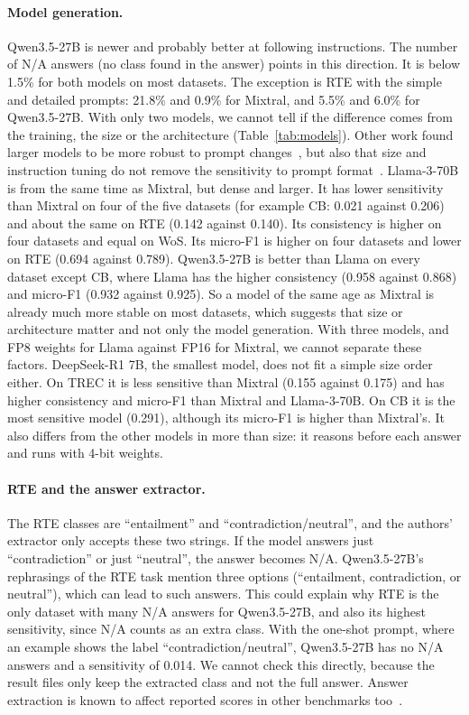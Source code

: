 \paragraph{Model generation.}
Qwen3.5-27B is newer and probably better at following instructions. The
number of N/A answers (no class found in the answer) points in this
direction. It is below 1.5\% for both models on most datasets. The exception
is RTE with the simple and detailed prompts: 21.8\% and 0.9\% for Mixtral,
and 5.5\% and 6.0\% for Qwen3.5-27B. With only two models, we cannot tell if
the difference comes from the training, the size or the architecture
(Table~\ref{tab:models}). Other work found larger models to be more robust to
prompt changes~\cite{Zhuo:2024}, but also that size and instruction tuning do
not remove the sensitivity to prompt format~\cite{Sclar:2024}. 
Llama-3-70B is from the same time as Mixtral, but dense and larger. It has
lower sensitivity than Mixtral on four of the five datasets (for example CB: 0.021 against 0.206) and about the same on RTE (0.142 against 0.140). Its consistency is higher on four datasets and equal on WoS. Its micro-F1 is higher on four datasets and lower on RTE (0.694 against 0.789). Qwen3.5-27B is better than Llama on every dataset except CB, where Llama has the higher consistency (0.958 against 0.868) and micro-F1 (0.932 against 0.925). So a model of the same age as Mixtral is already much more stable on most datasets, which suggests that size or architecture matter and not only the model generation. With three models, and FP8 weights for Llama
against FP16 for Mixtral, we cannot separate these factors.
DeepSeek-R1 7B, the smallest model, does not fit a simple size order either.
On TREC it is less sensitive than Mixtral (0.155 against 0.175) and has higher
consistency and micro-F1 than Mixtral and Llama-3-70B. On CB it is the most
sensitive model (0.291), although its micro-F1 is higher than Mixtral's. It
also differs from the other models in more than size: it reasons before each
answer and runs with 4-bit weights.

\paragraph{RTE and the answer extractor.}
The RTE classes are ``entailment'' and ``contradiction/neutral'', and the
authors' extractor only accepts these two strings. If the model answers just
``contradiction'' or just ``neutral'', the answer becomes N/A. Qwen3.5-27B's
rephrasings of the RTE task mention three options (``entailment,
contradiction, or neutral''), which can lead to such answers. This could
explain why RTE is the only dataset with many N/A answers for Qwen3.5-27B,
and also its highest sensitivity, since N/A counts as an extra class. With
the one-shot prompt, where an example shows the label
``contradiction/neutral'', Qwen3.5-27B has no N/A answers and a sensitivity
of 0.014. We cannot check this directly, because the result files only keep
the extracted class and not the full answer. Answer extraction is known to
affect reported scores in other benchmarks too~\cite{Molfese:2025}.

